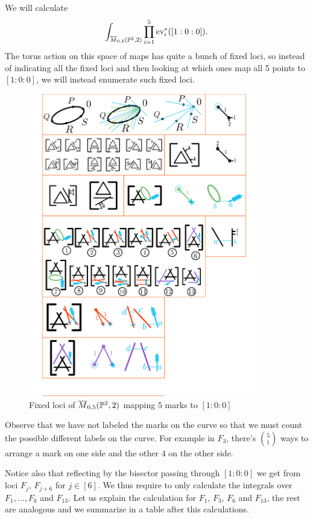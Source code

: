 \documentclass[12pt]{memoir}
\begin{document}
\begin{Ex}
We will calculate 
    $$\int_{\overline{M}_{0,5}(\mathbb{P}^2,2)}\prod_{i=1}^{5}\operatorname{ev}_i^\ast([1:0:0]).$$
    The torus action on this space of maps has quite a bunch of fixed loci, so instead of indicating all the fixed loci and then looking at which ones map all 5 points to $[1:0:0]$, we will instead enumerate such fixed loci.
    \begin{figure}[h!]
        \centering
        \includegraphics[width=0.9\textwidth, trim= 1.32cm 9.4cm 5.2cm 12.1cm,clip]{../figs/FigsDNnotability3.pdf}
        \caption{Fixed loci of $\overline M_{0,5}(\mathbb{P}^2,2)$ mapping $5$ marks to $[1:0:0]$}
        \label{fig:fixed-loci-M05P22-100}
    \end{figure}
    Observe that we have not labeled the marks on the curve so that we must count the possible different labels on the curve. For example in $F_3$, there's $\binom{5}{1}$ ways to arrange a mark on one side and the other $4$ on the other side.\par
    Notice also that reflecting by the bisector passing through $[1:0:0]$ we get from loci $F_j$, $F_{j+6}$ for $j\in[6]$. We thus require to only calculate the integrals over $F_1,\dots,F_6$ and $F_{13}$. Let us explain the calculation for $F_1$, $F_3$, $F_6$ and $F_{13}$, the rest are analogous and we summarize in a table after this calculations.\par

\end{Ex}
\end{document}
